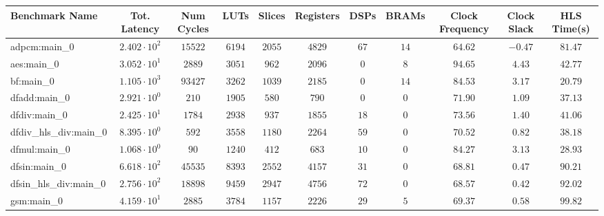 \begin{tabular}{|l|c|c|c|c|c|c|c|c|c|c|}
\hline
Benchmark Name          & Tot. Latency           & Num Cycles & LUTs      & Slices    & Registers & DSPs    & BRAMs   & Clock Frequency & Clock Slack & HLS Time(s) \\
\hline
adpcm:main\_0           & $ 2.402 \cdot 10^{2} $ & $ 15522  $ & $ 6194  $ & $ 2055  $ & $ 4829  $ & $ 67  $ & $ 14  $ & $ 64.62       $ & $ -0.47   $ & $ 81.47   $ \\
aes:main\_0             & $ 3.052 \cdot 10^{1} $ & $ 2889   $ & $ 3051  $ & $ 962   $ & $ 2096  $ & $ 0   $ & $ 8   $ & $ 94.65       $ & $ 4.43    $ & $ 42.77   $ \\
bf:main\_0              & $ 1.105 \cdot 10^{3} $ & $ 93427  $ & $ 3262  $ & $ 1039  $ & $ 2185  $ & $ 0   $ & $ 14  $ & $ 84.53       $ & $ 3.17    $ & $ 20.79   $ \\
dfadd:main\_0           & $ 2.921 \cdot 10^{0} $ & $ 210    $ & $ 1905  $ & $ 580   $ & $ 790   $ & $ 0   $ & $ 0   $ & $ 71.90       $ & $ 1.09    $ & $ 37.13   $ \\
dfdiv:main\_0           & $ 2.425 \cdot 10^{1} $ & $ 1784   $ & $ 2938  $ & $ 937   $ & $ 1855  $ & $ 18  $ & $ 0   $ & $ 73.56       $ & $ 1.40    $ & $ 41.06   $ \\
dfdiv\_hls\_div:main\_0 & $ 8.395 \cdot 10^{0} $ & $ 592    $ & $ 3558  $ & $ 1180  $ & $ 2264  $ & $ 59  $ & $ 0   $ & $ 70.52       $ & $ 0.82    $ & $ 38.18   $ \\
dfmul:main\_0           & $ 1.068 \cdot 10^{0} $ & $ 90     $ & $ 1240  $ & $ 412   $ & $ 683   $ & $ 10  $ & $ 0   $ & $ 84.27       $ & $ 3.13    $ & $ 28.93   $ \\
dfsin:main\_0           & $ 6.618 \cdot 10^{2} $ & $ 45535  $ & $ 8393  $ & $ 2552  $ & $ 4157  $ & $ 31  $ & $ 0   $ & $ 68.81       $ & $ 0.47    $ & $ 90.21   $ \\
dfsin\_hls\_div:main\_0 & $ 2.756 \cdot 10^{2} $ & $ 18898  $ & $ 9459  $ & $ 2947  $ & $ 4756  $ & $ 72  $ & $ 0   $ & $ 68.57       $ & $ 0.42    $ & $ 92.02   $ \\
gsm:main\_0             & $ 4.159 \cdot 10^{1} $ & $ 2885   $ & $ 3784  $ & $ 1157  $ & $ 2226  $ & $ 29  $ & $ 5   $ & $ 69.37       $ & $ 0.58    $ & $ 99.82   $ \\

\end{tabular}
